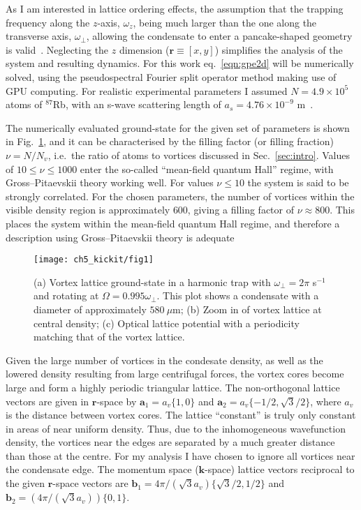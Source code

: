 As I am interested in lattice ordering effects, the assumption that the trapping frequency along the $z$-axis, $\omega_z$, being much larger than the one along the transverse axis, $\omega_\perp$, allowing the condensate to enter a pancake-shaped geometry is valid~\cite{BEC:Fetter_revmodphys_2009}. Neglecting the $z$ dimension ($\textbf{r}\equiv [x,y]$) simplifies the analysis of the system and resulting dynamics. For this work eq.~\eqref{eqn:gpe2d} will be numerically solved, using the pseudospectral Fourier split operator method making use of GPU computing\cite{NUMERICS}. For realistic experimental parameters I assumed  $N=4.9\times 10^5$ atoms of $^{87}$Rb, with an s-wave scattering length of $a_s=4.76\times10^{-9}$ m~\cite{AO:Roberts_prl_1998}.

The numerically evaluated ground-state for the given set of parameters is shown in Fig.~\ref{fig:vlatt_gnd}, and it can be characterised by the filling factor (or filling fraction) $\nu=N/N_v$, i.e.~the ratio of atoms to vortices discussed in Sec.~\ref{sec:intro}. Values of $10 \leq \nu \leq 1000$ enter the so-called ``mean-field quantum Hall'' regime, with Gross--Pitaevskii theory working well. For values $\nu \leq 10$ the system is said to be strongly correlated. For the chosen parameters, the number of vortices within the visible density region is approximately 600, giving a filling factor of $\nu \approx 800 $. This places the system within the mean-field quantum Hall regime, and therefore a description using Gross--Pitaevskii theory is adequate~\cite{Vtx:Schweikhard_prl_2004}

\begin{figure}[tb]
    \centering
    \texttt{[image: ch5\_kickit/fig1]}
    \caption[Comparison of vortex lattice and optical lattice structures.]{(a) Vortex lattice ground-state in a harmonic trap with $\omega_\perp=2\pi$ s$^{-1}$ and rotating at $\Omega=0.995\omega_\perp$. This plot shows a condensate with a diameter of approximately $580~\mu\textrm{m}$; (b) Zoom in of vortex lattice at central density; (c) Optical lattice potential with a periodicity matching that of the vortex lattice.}
    \label{fig:vlatt_gnd}
\end{figure}

Given the large number of vortices in the condesate density, as well as the lowered density resulting from large centrifugal forces, the vortex cores become large and form a highly periodic triangular lattice. The non-orthogonal lattice vectors are given in $\mathbf{r}$-space by $\mathbf{a}_1 = a_v\{1,0\}$ and $\mathbf{a}_2 = a_v\{-1/2, \sqrt{3}/2\}$, where $a_v$ is the distance between vortex cores. The lattice ``constant'' is truly only constant in areas of near uniform density. Thus, due to the inhomogeneous wavefunction density, the vortices near the edges are separated by a much greater distance than those at the centre. For my analysis I have chosen to ignore all vortices near the condensate edge. The momentum space ($\mathbf{k}$-space) lattice vectors reciprocal to the given $\mathbf{r}$-space vectors are $\mathbf{b}_1 = 4\pi/(\sqrt{3}a_v)\{\sqrt{3}/2,1/2\}$ and $\mathbf{b}_2 = (4\pi/(\sqrt{3}a_v))\{0,1\}$.

